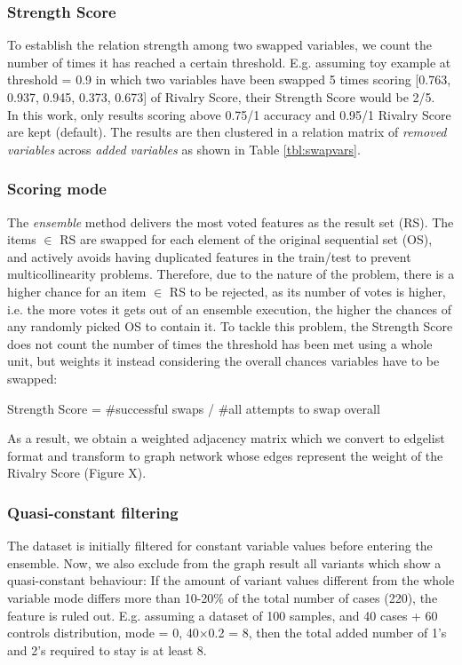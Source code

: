 \subsubsection{Strength Score}
To establish the relation strength among two swapped variables, we count the number of times it has reached a certain threshold. E.g. assuming toy example at threshold = 0.9 in which two variables have been swapped 5 times scoring [0.763, 0.937, 0.945, 0.373, 0.673] of Rivalry Score, their Strength Score would be 2/5.
\\

In this work, only results scoring above 0.75/1 accuracy and 0.95/1 Rivalry Score are kept (default). The results are then clustered in a relation matrix of \textit{removed variables} across \textit{added variables} as shown in Table \ref{tbl:swapvars}. 
\\

\subsubsection{Scoring mode}
The \emph{ensemble} method delivers the most voted features as the result set (RS). The items $\in$ RS are swapped for each element of the original sequential set (OS), and actively avoids having duplicated features in the train/test to prevent multicollinearity problems. Therefore, due to the nature of the problem, there is a higher chance for an item $\in$ RS to be rejected, as its number of votes is higher, i.e. the more votes it gets out of an ensemble execution, the higher the chances of any randomly picked OS to contain it. To tackle this problem, the Strength Score does not count the number of times the threshold has been met using a whole unit, but weights it instead considering the overall chances variables have to be swapped:

\begin{center}
    Strength Score = \#successful swaps / \#all attempts to swap overall
\end{center}

As a result, we obtain a weighted adjacency matrix which we convert to edgelist format and transform to graph network whose edges represent the weight of the Rivalry Score (Figure X).
\\

\subsubsection{Quasi-constant filtering}
The dataset is initially filtered for constant variable values before entering the ensemble. Now, we also exclude from the graph result all variants which show a quasi-constant behaviour: If the amount of variant values different from the whole variable mode differs more than 10-20\% of the total number of cases (220), the feature is ruled out. E.g. assuming a dataset of 100 samples, and 40 cases + 60 controls distribution, mode = 0, 40$\times$0.2 = 8, then the total added number of 1's and 2's required to stay is at least 8.

